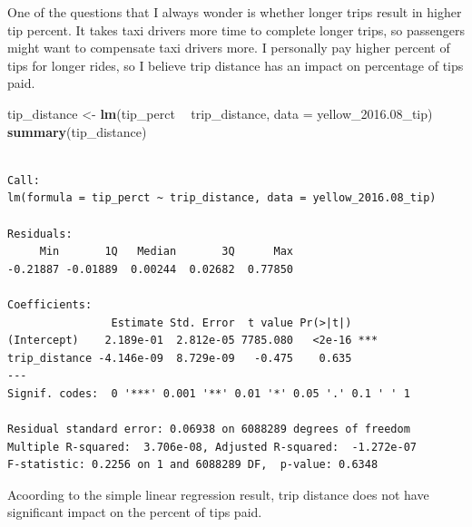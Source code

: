 \documentclass[12pt,twoside]{reedthesis}
\newenvironment{Shaded}{\begin{snugshade}}{\end{snugshade}}
\newcommand{\KeywordTok}[1]{\textcolor[rgb]{0.13,0.29,0.53}{\textbf{#1}}}
\newcommand{\DataTypeTok}[1]{\textcolor[rgb]{0.13,0.29,0.53}{#1}}
\newcommand{\FloatTok}[1]{\textcolor[rgb]{0.00,0.00,0.81}{#1}}
\newcommand{\StringTok}[1]{\textcolor[rgb]{0.31,0.60,0.02}{#1}}
\newcommand{\OperatorTok}[1]{\textcolor[rgb]{0.81,0.36,0.00}{\textbf{#1}}}
\newcommand{\NormalTok}[1]{#1}
\theoremstyle{definition}
\theoremstyle{definition}
\theoremstyle{definition}
\theoremstyle{remark}
\begin{document}
One of the questions that I always wonder is whether longer trips result
in higher tip percent. It takes taxi drivers more time to complete
longer trips, so passengers might want to compensate taxi drivers more.
I personally pay higher percent of tips for longer rides, so I believe
trip distance has an impact on percentage of tips paid.
\begin{Shaded}
\begin{Highlighting}[]
\NormalTok{tip_distance <-}\StringTok{ }\KeywordTok{lm}\NormalTok{(tip_perct }\OperatorTok{~}\StringTok{ }\NormalTok{trip_distance, }\DataTypeTok{data =}\NormalTok{ yellow_}\FloatTok{2016.}\NormalTok{08_tip)}
\KeywordTok{summary}\NormalTok{(tip_distance)}
\end{Highlighting}
\end{Shaded}
\begin{verbatim}

Call:
lm(formula = tip_perct ~ trip_distance, data = yellow_2016.08_tip)

Residuals:
     Min       1Q   Median       3Q      Max 
-0.21887 -0.01889  0.00244  0.02682  0.77850 

Coefficients:
                Estimate Std. Error  t value Pr(>|t|)    
(Intercept)    2.189e-01  2.812e-05 7785.080   <2e-16 ***
trip_distance -4.146e-09  8.729e-09   -0.475    0.635    
---
Signif. codes:  0 '***' 0.001 '**' 0.01 '*' 0.05 '.' 0.1 ' ' 1

Residual standard error: 0.06938 on 6088289 degrees of freedom
Multiple R-squared:  3.706e-08, Adjusted R-squared:  -1.272e-07 
F-statistic: 0.2256 on 1 and 6088289 DF,  p-value: 0.6348
\end{verbatim}
Acoording to the simple linear regression result, trip distance does not
have significant impact on the percent of tips paid.
\end{document}
